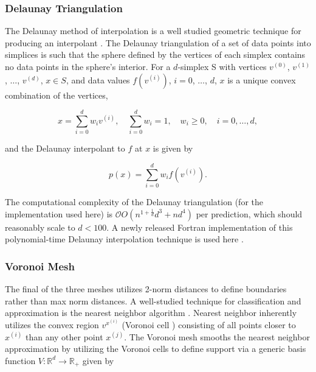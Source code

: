 \documentclass[sigconf]{acmart}
\begin{document}



\subsubsection{Delaunay Triangulation}

The Delaunay method of interpolation is a well studied geometric technique for producing an interpolant \cite{lee1980two}. The Delaunay triangulation of a set of data points into simplices is such that the sphere defined by the vertices of each simplex contains no data points in the sphere's interior. For a $d$-simplex S with vertices $v^{(0)}$, $v^{(1)}$, $\ldots$, $v^{(d)}$, $x \in S$, and data values $f(v^{(i)})$, $i=0$, $\ldots$, $d$, $x$ is a unique convex combination of the vertices,

$$ x = \sum_{i=0}^{d} w_i v^{(i)}, \quad \sum_{i=0}^{d} w_i = 1, \quad
w_i \geq 0, \quad i=0,\ldots,d ,$$

and the Delaunay interpolant to $f$ at $x$ is given by

$$ p(x) = \sum_{i=0}^{d} w_i f(v^{(i)}). $$

The computational complexity of the Delaunay triangulation (for the implementation used here) is $\mathcal{O} O(n^{1+\frac{1}{d}} d^{3} + n d^{4})$ per prediction, which should reasonably scale to $d < 100$. A newly released Fortran implementation of this polynomial-time Delaunay interpolation technique is used here \cite{chang2018polynomial}.

\subsubsection{Voronoi Mesh}

The final of the three meshes utilizes 2-norm distances to define boundaries rather than max norm distances. A well-studied technique for classification and approximation is the nearest neighbor algorithm \cite{cover1967nearest}. Nearest neighbor inherently utilizes the convex region $v^{x^{(i)}}$ (Voronoi cell \cite{dirichlet1850reduction}) consisting of all points closer to $x^{(i)}$ than any other point $x^{(j)}$. The Voronoi mesh smooths the nearest neighbor approximation by utilizing the Voronoi cells to define support via a generic basis function $V: \mathbb{R}^d \rightarrow \mathbb{R}_+$ given by
\end{document}
